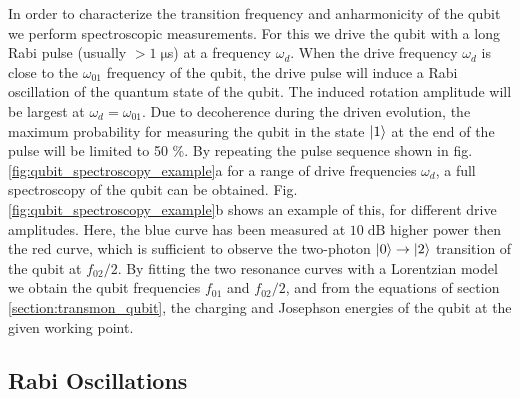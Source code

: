 In order to characterize the transition frequency and anharmonicity of the qubit we perform spectroscopic measurements. For this we drive the qubit with a long Rabi pulse (usually $> 1\;\mathrm{\mu}$s) at a frequency $\omega_d$. When the drive frequency $\omega_{d}$ is close to the $\omega_{01}$ frequency of the qubit, the drive pulse will induce a Rabi oscillation of the quantum state of the qubit. The induced rotation amplitude will be largest at $\omega_d=\omega_{01}$. Due to decoherence during the driven evolution, the maximum probability for measuring the qubit in the state $\left| 1 \right>$ at the end of the pulse will be limited to 50 \%. By repeating the pulse sequence shown in fig. \ref{fig:qubit_spectroscopy_example}a for a range of drive frequencies $\omega_d$, a full spectroscopy of the qubit can be obtained. Fig. \ref{fig:qubit_spectroscopy_example}b shows an example of this, for different drive amplitudes. Here, the blue curve has been measured at $10\;\mathrm{dB}$ higher power then the red curve, which is sufficient to observe the two-photon $\left| 0 \right>\to\left| 2 \right>$ transition of the qubit at $f_{02}/2$. By fitting the two resonance curves with a Lorentzian model we obtain the qubit frequencies $f_{01}$ and $f_{02}/2$, and from the equations of section \ref{section:transmon_qubit}, the charging and Josephson energies of the qubit at the given working point.

\subsection{Rabi Oscillations} \label{section:qubit_rabi}

